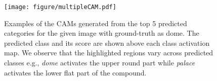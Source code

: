 \documentclass[10pt,twocolumn,letterpaper]{article}
\begin{document}
\begin{figure}
\begin{center}
\texttt{[image: figure/multipleCAM.pdf]}
\end{center}
\vspace*{-4mm}
 \caption{Examples of the CAMs generated from the top 5 predicted categories for the given image with ground-truth as dome. The predicted class and its score are shown above each class activation map. We observe that the highlighted regions vary across predicted classes e.g., \textit{dome} activates the upper round part while \textit{palace} activates the lower flat part of the compound.}\label{figure_multipleprediction}
\end{figure}





\end{document}
